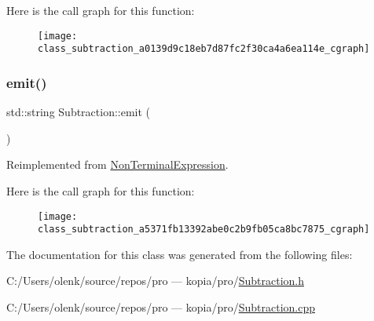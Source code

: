 Here is the call graph for this function\+:
\nopagebreak
\begin{figure}[H]
\begin{center}
\leavevmode
\texttt{[image: class\_subtraction\_a0139d9c18eb7d87fc2f30ca4a6ea114e\_cgraph]}
\end{center}
\end{figure}
\mbox{\label{class_subtraction_a5371fb13392abe0c2b9fb05ca8bc7875}} 
\subsubsection{\texorpdfstring{emit()}{emit()}}
{\footnotesize\ttfamily std\+::string Subtraction\+::emit (\begin{DoxyParamCaption}{ }\end{DoxyParamCaption})\hspace{0.3cm}{\ttfamily [virtual]}}



Reimplemented from \mbox{\hyperlink{class_non_terminal_expression_affcc5d6e649552b3788661ec9663eb63}{Non\+Terminal\+Expression}}.

Here is the call graph for this function\+:
\nopagebreak
\begin{figure}[H]
\begin{center}
\leavevmode
\texttt{[image: class\_subtraction\_a5371fb13392abe0c2b9fb05ca8bc7875\_cgraph]}
\end{center}
\end{figure}


The documentation for this class was generated from the following files\+:\begin{DoxyCompactItemize}
\item 
C\+:/\+Users/olenk/source/repos/pro — kopia/pro/\mbox{\hyperlink{_subtraction_8h}{Subtraction.\+h}}\item 
C\+:/\+Users/olenk/source/repos/pro — kopia/pro/\mbox{\hyperlink{_subtraction_8cpp}{Subtraction.\+cpp}}\end{DoxyCompactItemize}
